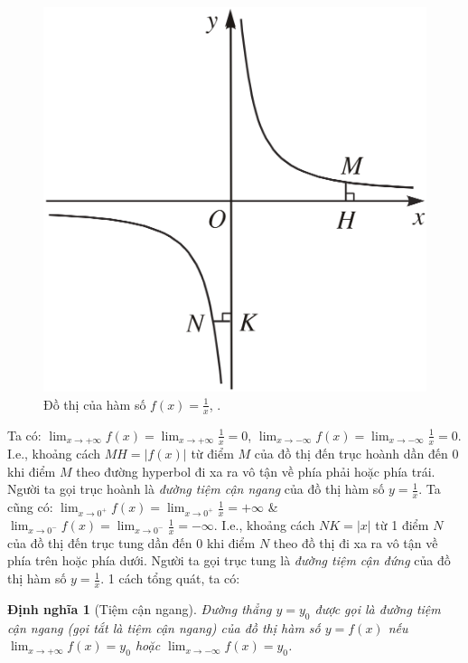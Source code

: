 \documentclass{article}
\numberwithin{equation}{section}
\newtheorem{dinhnghia}{Định nghĩa}[section]
\begin{document}
\begin{figure}[h]
	\centering
	\includegraphics[scale=0.13]{hyperbol}
	\caption{Đồ thị của hàm số $f(x) = \frac{1}{x}$, \cite[Hình 1.6, p. 28]{SGK_Toan_12_giai_tich_nang_cao}.}
	\label{fig:hyperbol}
\end{figure}
Ta có: $\lim_{x\to+\infty} f(x) = \lim_{x\to+\infty} \frac{1}{x} = 0$, $\lim_{x\to-\infty} f(x) = \lim_{x\to-\infty} \frac{1}{x} = 0$. I.e., khoảng cách $MH = |f(x)|$ từ điểm $M$ của đồ thị đến trục hoành dần đến $0$ khi điểm $M$ theo đường hyperbol đi xa ra vô tận về phía phải hoặc phía trái. Người ta gọi trục hoành là \textit{đường tiệm cận ngang} của đồ thị hàm số $y = \frac{1}{x}$. Ta cũng có: $\lim_{x\to 0^+} f(x) = \lim_{x\to 0^+} \frac{1}{x} = +\infty$ \& $\lim_{x\to 0^-} f(x) = \lim_{x\to 0^-} \frac{1}{x} = -\infty$. I.e., khoảng cách $NK = |x|$ từ 1 điểm $N$ của đồ thị đến trục tung dần đến $0$ khi điểm $N$ theo đồ thị đi xa ra vô tận về phía trên hoặc phía dưới. Người ta gọi trục tung là \textit{đường tiệm cận đứng} của đồ thị hàm số $y = \frac{1}{x}$. 1 cách tổng quát, ta có:

\begin{dinhnghia}[Tiệm cận ngang]
	Đường thẳng $y = y_0$ được gọi là \emph{đường tiệm cận ngang} (gọi tắt là \emph{tiệm cận ngang}) của đồ thị hàm số $y = f(x)$ nếu $\lim_{x\to+\infty} f(x) = y_0$ hoặc $\lim_{x\to-\infty} f(x) = y_0$.
\end{dinhnghia}
\end{document}

